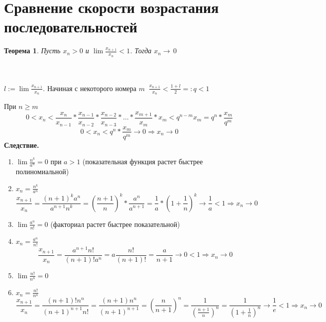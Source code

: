 \documentclass[12pt,letterpaper]{report}
\makeatletter
\newtheorem*{theorem-non}{Теорема}
\theoremstyle{definition}
\renewenvironment{proof}[1][\proofname]{%
   \par\pushQED{\qed}\normalfont%
   \topsep6\p@\@plus6\p@\relax
   \trivlist\item[\hskip\labelsep\bfseries#1\@addpunct{.}]%
   \ignorespaces
}{%
   \popQED\endtrivlist\@endpefalse
}
\makeatother
\begin{document}
    \section{Сравнение скорости возрастания последовательностей}
    \begin{theorem-non}
        Пусть $x_n > 0$ и $\lim \frac{x_{n+1}}{x_n} < 1$. Тогда $x_n \to\,0$
    \end{theorem-non}
    \begin{proof} \quad \\\\
        $l := \lim \frac{x_{n+1}}{x_n}$. Начиная с некоторого номера $m \;\; \frac{x_{n+1}}{x_n} < \frac{1 + l}{2} =: q < 1$
        
        При $n \geqslant m$ 
        \[ 0 < x_n < \frac{x_n}{x_{n-1}} * \frac{x_{n-1}}{x_{n-2}} * \frac{x_{n-2}}{x_{n-3}} * \dots * \frac{x_{m+1}}{x_m} * x_m < q^{n-m}x_m = q^n * \frac{x_m}{q^m} \]
        \[ 0 < x_n < q^n * \frac{x_m}{q^m} \to 0 \Rightarrow x_n \to 0  \]
    \end{proof}
    \textbf{Следствие.}
    \begin{enumerate}
        \item $\lim \frac{n^k}{a^n} = 0$ при $a > 1$ (показательная функция растет быстрее полиномиальной)
        \begin{proof}
            $x_n = \frac{n^k}{a^n}$
            \[ \frac{x_{n+1}}{x_n} =
            \frac{(n+1)^ka^n}{a^{n+1}n^k} = 
             (\frac{n+1}{n})^k * \frac{a^n}{a^{n+1}} = \frac{1}{a} * (1 + \frac{1}{n})^k \to \frac{1}{a} < 1 \Rightarrow x_n \to 0\]
        \end{proof}
        \item $\lim \frac{a^n}{n!} = 0$ (факториал растет быстрее показательной)
        \begin{proof}
            $x_n = \frac{a^n}{n!}$
            \[ \frac{x_{n+1}}{x_n} =  \frac{a^{n+1}n!}{(n+1)!a^n}
            = a\frac{n!}{(n+1)!} = \frac{a}{n+1} \to 0 < 1 \Rightarrow x_n \to 0 \]
        \end{proof}
        \item $\lim \frac{n!}{n^n} = 0$
        \begin{proof}
            $x_n = \frac{n!}{n^n}$
            \[ \frac{x_{n+1}}{x_n} = \frac{(n+1)!n^n}{(n+1)^{n+1}n!} = \frac{(n+1)n^n}{(n+1)^{n+1}} = (\frac{n}{n+1})^n = \frac{1}{(\frac{n + 1}{n})^n} = \frac{1}{(1 + \frac{1}{n})^n} \to \frac{1}{e} < 1 \Rightarrow x_n \to 0 \]
        \end{proof}
    \end{enumerate}
\end{document}
